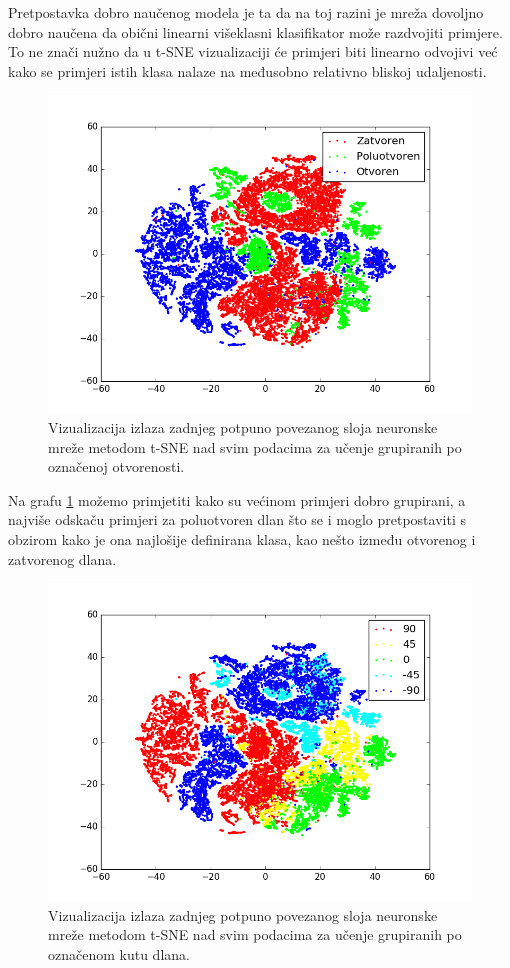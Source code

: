 \documentclass[times, utf8, diplomski, numeric]{fer}
\begin{document}
Pretpostavka dobro naučenog modela je ta da na toj razini je mreža dovoljno dobro naučena da obični linearni višeklasni klasifikator može razdvojiti primjere. To ne znači nužno da u t-SNE vizualizaciji će primjeri biti linearno odvojivi već kako se primjeri istih klasa nalaze na međusobno relativno bliskoj udaljenosti.

\begin{figure}[h!]
\centering
\includegraphics[width = 1.0\textwidth]{detekcija/train_otvorenost}
\caption{Vizualizacija izlaza zadnjeg potpuno povezanog sloja neuronske mreže metodom t-SNE nad svim podacima za učenje grupiranih po označenoj otvorenosti.} \label{tsne-otvorenost}
\end{figure}

Na grafu \ref{tsne-otvorenost} možemo primjetiti kako su većinom primjeri dobro grupirani, a najviše odskaču primjeri za poluotvoren dlan što se i moglo pretpostaviti s obzirom kako je ona najlošije definirana klasa, kao nešto između otvorenog i zatvorenog dlana.

\begin{figure}[h!]
\centering
\includegraphics[width = 1.0\textwidth]{detekcija/train_kut}
\caption{Vizualizacija izlaza zadnjeg potpuno povezanog sloja neuronske mreže metodom t-SNE nad svim podacima za učenje grupiranih po označenom kutu dlana.} \label{tsne-kut}
\end{figure}
\end{document}
